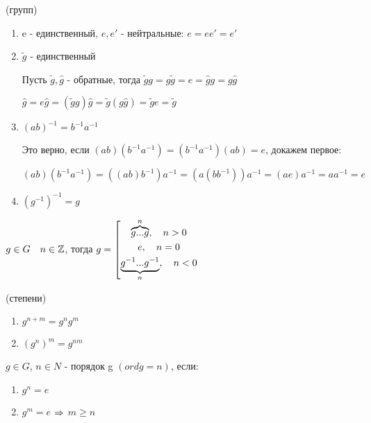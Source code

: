 \documentclass[11pt]{article}
\begin{document}
\begin{properties2}{(групп)}
    \begin{enumerate}  
        \item e - единственный, $e,e'$ - нейтральные: $e=e e'=e'$
        \item $\widetilde{g}$ - единственный
        
        Пусть $\widetilde{g},\hat{g}$ - обратные, тогда $\widetilde{g}g = g\widetilde{g} = e = \hat{g}g = g\hat{g}$
        
        $\hat{g}=e \hat{g}=(\widetilde{g}g)\hat{g}=\widetilde{g}(g\hat{g})=\widetilde{g}e=\widetilde{g}$
        \item $(a b)^{-1}=b^{-1}a^{-1}$
        
        Это верно, если $(ab)(b^{-1}a^{-1})=(b^{-1}a^{-1})(ab)=e$, докажем первое:
        
        $(ab)(b^{-1}a^{-1})=((ab)b^{-1})a^{-1}=(a(bb^{-1}))a^{-1}=(ae)a^{-1}=a a^{-1}=e$
        \item $(g^{-1})^{-1}=g$
    \end{enumerate} 
\end{properties2}

\begin{definition}
    $g \in G \quad n \in \mathbb{Z}$, тогда $g=
\left[ 
  \begin{gathered} 
    \overbrace{g...g}^n, \quad n>0\\
    e, \quad n=0\\ 
    \underbrace{g^{-1}...g^{-1}}_n, \quad n<0
  \end{gathered} 
\right.$
\end{definition}

\begin{properties2}{(степени)}
    \begin{enumerate}                               
    	\item $g^{n+m}=g^n g^m$
    	\item $(g^n)^m=g^{n m}$
	\end{enumerate} 
\end{properties2}

\begin{definition}
    $g \in G$, $n \in N$ - порядок g $(ord g = n)$, если:
    \begin{enumerate}                               
    	\item $g^n=e$
    	\item $g^m=e$ $\Rightarrow$ $m \geqslant n$
	\end{enumerate} 
\end{definition}
\end{document}
